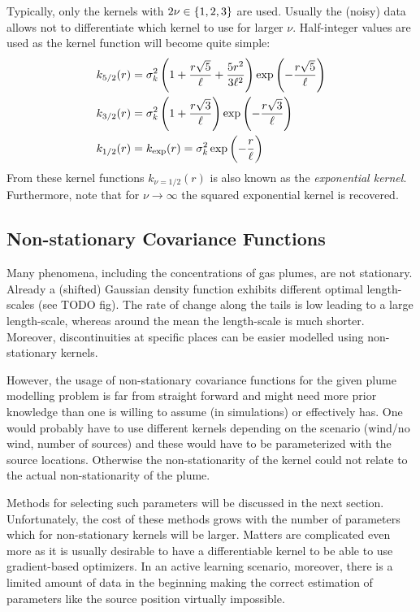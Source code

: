 \documentclass[11pt,a4paper]{scrreprt}
\newcommand{\newterm}[1]{\emph{#1}}
\begin{document}
Typically, only the kernels with $2\nu \in \cbr{1, 2, 3}$ are used.  Usually the 
(noisy) data allows not to differentiate which kernel to use for larger $\nu$.  
Half-integer values are used as the kernel function will become quite simple:
\begin{align}
    k_{5/2}(r) &= \sigma_k^2 \del{1 + \frac{r\sqrt{5}}{\ell} 
        + \frac{5r^2}{3\ell^2}} \exp\del{-\frac{r\sqrt{5}}{\ell}} \\
    k_{3/2}(r) &= \sigma_k^2 \del{1 + \frac{r\sqrt{3}}{\ell}} 
    \exp\del{-\frac{r\sqrt{3}}{\ell}} \\
    k_{1/2}(r) &= k_{\exp}(r) = \sigma_k^2 \exp\del{-\frac{r}{\ell}}
\end{align}
From these kernel functions $k_{\nu=1/2}(r)$ is also known as the 
\newterm{exponential kernel}. Furthermore, note that for $\nu \rightarrow 
\infty$ the squared exponential kernel is recovered.


\subsection{Non-stationary Covariance Functions}
Many phenomena, including the concentrations of gas plumes, are not stationary.  
Already a (shifted) Gaussian density function exhibits different optimal 
length-scales (see TODO fig). The rate of change along the tails is low leading 
to a large length-scale, whereas around the mean the length-scale is much 
shorter.  Moreover, discontinuities at specific places can be easier modelled 
using non-stationary kernels.

However, the usage of non-stationary covariance functions for the given plume 
modelling problem is far from straight forward and might need more prior 
knowledge than one is willing to assume (in simulations) or effectively has.  
One would probably have to use different kernels depending on the scenario 
(wind/no wind, number of sources) and these would have to be parameterized with 
the source locations. Otherwise the non-stationarity of the kernel could not 
relate to the actual non-stationarity of the plume.

Methods for selecting such parameters will be discussed in the next section.  
Unfortunately, the cost of these methods grows with the number of parameters 
which for non-stationary kernels will be larger. Matters are complicated even 
more as it is usually desirable to have a differentiable kernel to be able to 
use gradient-based optimizers. In an active learning scenario, moreover, there 
is a limited amount of data in the beginning making the correct estimation of 
parameters like the source position virtually impossible.
\end{document}
